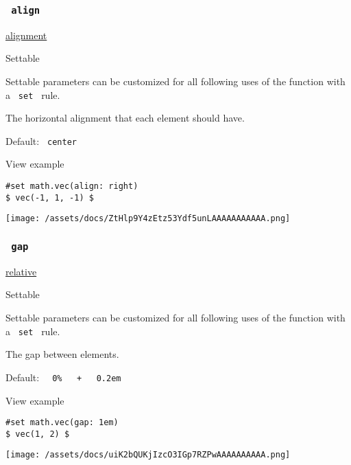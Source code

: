 \subsubsection{\texorpdfstring{\texttt{\ align\ }}{ align }}\label{parameters-align}

\href{/docs/reference/layout/alignment/}{alignment}

{{ Settable }}

\label{parameters-align-settable-tooltip}
Settable parameters can be customized for all following uses of the
function with a \texttt{\ set\ } rule.

The horizontal alignment that each element should have.

Default: \texttt{\ center\ }


View example

\begin{verbatim}
#set math.vec(align: right)
$ vec(-1, 1, -1) $
\end{verbatim}

\texttt{[image: /assets/docs/ZtHlp9Y4zEtz53Ydf5unLAAAAAAAAAAA.png]}

\subsubsection{\texorpdfstring{\texttt{\ gap\ }}{ gap }}\label{parameters-gap}

\href{/docs/reference/layout/relative/}{relative}

{{ Settable }}

\label{parameters-gap-settable-tooltip}
Settable parameters can be customized for all following uses of the
function with a \texttt{\ set\ } rule.

The gap between elements.

Default:
\texttt{\ }{\texttt{\ 0\%\ }}\texttt{\ }{\texttt{\ +\ }}\texttt{\ }{\texttt{\ 0.2em\ }}\texttt{\ }


View example

\begin{verbatim}
#set math.vec(gap: 1em)
$ vec(1, 2) $
\end{verbatim}

\texttt{[image: /assets/docs/uiK2bQUKjIzcO3IGp7RZPwAAAAAAAAAA.png]}

